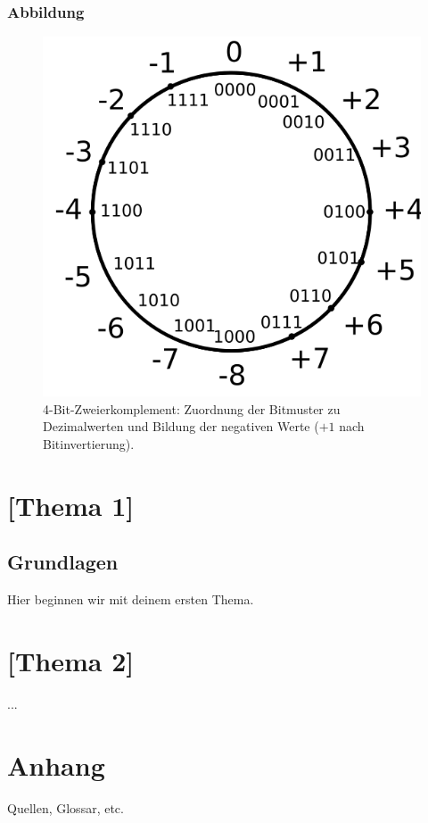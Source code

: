 \documentclass[12pt,a4paper]{book}
\begin{document}
\subsection*{Abbildung}
\begin{figure}[H]
	\centering
	\includegraphics[width=.72\textwidth]{4Bit-2Komplement.png}
	\caption{4-Bit-Zweierkomplement: Zuordnung der Bitmuster zu Dezimalwerten und Bildung der negativen Werte (\(+1\) nach Bitinvertierung).}
	\label{fig:zweierkomplement-4bit}
\end{figure}






\chapter{[Thema 1]}
\section{Grundlagen}
Hier beginnen wir mit deinem ersten Thema.

\chapter{[Thema 2]}
...

\backmatter
\chapter*{Anhang}
Quellen, Glossar, etc.
\end{document}
